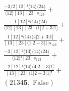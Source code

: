 \documentclass[varwidth, border=5pt]{standalone}
\begin{document}
\begin{my}
$\begin{gathered}
\scriptscriptstyle\frac{-3/2[12]³⟨14⟩⟨24⟩}{⟨12⟩[13][23]s_{123}} +\\
\scriptscriptstyle\frac{1[12]³⟨14⟩⟨24⟩}{⟨12⟩[13][23]⟨1|2+3|1]} +\\
\scriptscriptstyle\frac{1[12]³⟨14⟩⟨4|2+3|1]}{[13][23]⟨1|2+3|1]s_{123}} +\\
\scriptscriptstyle\frac{-3[12]²⟨13⟩⟨14⟩⟨24⟩}{⟨12⟩²[23]s_{123}} +\\
\scriptscriptstyle\frac{-2[12]³⟨14⟩⟨4|2+3|1]}{[13][23]⟨1|2+3|1]²} +\\
\scriptscriptstyle(2134𝟓,\;\text{False}) \phantom{+}
\end{gathered}$
\end{my}
\end{document}
